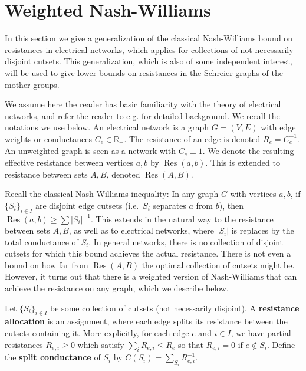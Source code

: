 \documentclass[12pt]{article}
\theoremstyle{definition}
\numberwithin{equation}{section}
\newcommand{\R}{\mathbb R}
\newcommand{\Res}{\operatorname{Res}}
\begin{document}
\section{Weighted Nash-Williams}
\label{sec:NW}

In this section we give a generalization of the classical Nash-Williams bound on resistances in electrical networks, which applies for collections of not-necessarily disjoint cutsets.
This generalization, which is also of some independent interest,  will be used to give lower bounds on resistances in the Schreier graphs of the mother groups.


We assume here the reader has basic familiarity with the theory of electrical networks, and refer the reader to e.g. \cite{LP,DS} for detailed background.
We recall the notations we use below.
An electrical network is a graph $G=(V,E)$ with edge weights or conductances $C_e\in\R_+$.
The resistance of an edge is denoted $R_e = C_e^{-1}$.
An unweighted graph is seen as a network with $C_e\equiv 1$.
We denote the resulting effective resistance between vertices $a,b$ by $\Res(a,b)$.
This is extended to resistance between sets $A,B$, denoted $\Res(A,B)$.

Recall the classical Nash-Williams inequality:
In any graph $G$ with vertices $a,b$, if $\{S_i\}_{i\in I}$ are disjoint edge cutsets (i.e.\ $S_i$ separates $a$ from $b$), then $\Res(a,b) \geq \sum |S_i|^{-1}$.
This extends in the natural way to the resistance between sets $A,B$, as well as to electrical networks, where $|S_i|$ is replaces by the total conductance of $S_i$.
In general networks, there is no collection of disjoint cutsets for which this bound achieves the actual resistance.
There is not even a bound on how far from $\Res(A,B)$ the
optimal collection of cutsets might be.  However, it turns out that there is
a weighted version of Nash-Williams that can achieve the resistance on any
graph, which we describe below.

Let $\{S_i\}_{i\in I}$ be some collection of cutsets (not necessarily disjoint).
A \textbf{resistance allocation} is an assignment, where each edge splits its resistance between the cutsets containing it.
More explicitly, for each edge $e$ and $i\in I$, we have partial resistances $R_{e,i}\geq 0$ which satisfy $\sum_i R_{e,i} \leq R_e$ so that $R_{e,i}=0$ if $e\not\in S_i$.
Define the \textbf{split conductance} of $S_i$ by $C(S_i) = \sum_{S_i} R_{e,i}^{-1}$.
\end{document}
